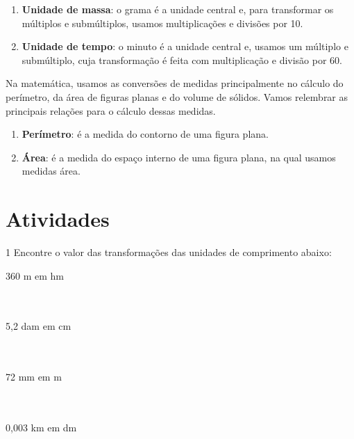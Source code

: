 {\begin{enumerate}
\item \textbf{Unidade de massa}: o grama é a unidade central e, para transformar
os múltiplos e submúltiplos, usamos multiplicações e divisões por 10.

\item \textbf{Unidade de tempo}: o minuto é a unidade central e, usamos um
múltiplo e submúltiplo, cuja transformação é feita com multiplicação e
divisão por 60.

\end{enumerate}


Na matemática, usamos as conversões de medidas principalmente no cálculo
do perímetro, da área de figuras planas e do volume de sólidos. Vamos
relembrar as principais relações para o cálculo dessas medidas.

\begin{enumerate}
\item \textbf{Perímetro}: é a medida do contorno de uma figura plana.
\item \textbf{Área}: é a medida do espaço interno de uma figura plana,
na qual usamos medidas área.
\end{enumerate}
}



\section*{Atividades}

\num{1} Encontre o valor das transformações das unidades de comprimento
abaixo:

\begin{multicols}{2}
\begin{escolha}[itemsep=0pt]

\item 360 m em hm \\ 
 \\ \\

\item 5,2 dam em cm \\ 
 \\ \\

\item 72 mm em m \\ 
 \\ \\

\item 0,003 km em dm \\ 
 \\ \\

\end{escolha}
\end{multicols}

